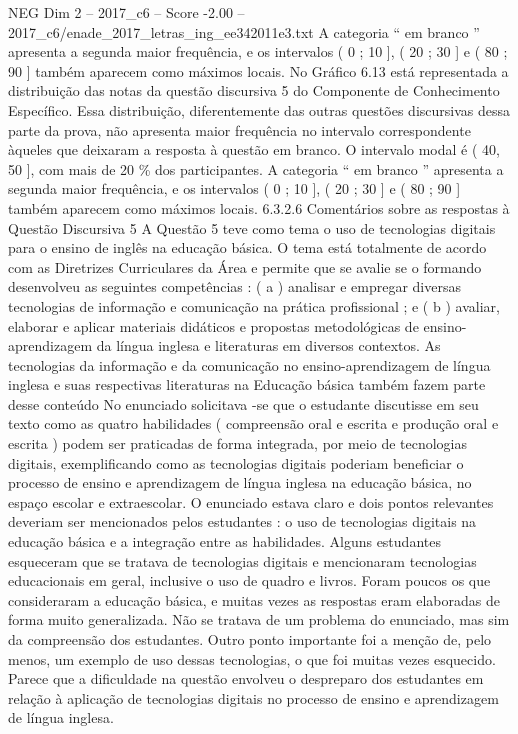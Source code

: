 \begin{textsample}{NEG Dim 2 – 2017\_c6 – Score -2.00 – 2017\_c6/enade\_2017\_letras\_ing\_ee342011e3.txt}
A categoria “ em branco ” apresenta a segunda maior frequência, e os intervalos ( 0 ; 10 ], ( 20 ; 30 ] e ( 80 ; 90 ] também aparecem como máximos locais.
No Gráfico 6.13 está representada a distribuição das notas da questão discursiva 5 do Componente de Conhecimento Específico.
Essa distribuição, diferentemente das outras questões discursivas dessa parte da prova, não apresenta maior frequência no intervalo correspondente àqueles que deixaram a resposta à questão em branco.
O intervalo modal é ( 40, 50 ], com mais de 20 \% dos participantes.
A categoria “ em branco ” apresenta a segunda maior frequência, e os intervalos ( 0 ; 10 ], ( 20 ; 30 ] e ( 80 ; 90 ] também aparecem como máximos locais. 6.3.2.6 Comentários sobre as respostas à Questão Discursiva 5 A Questão 5 teve como tema o uso de tecnologias digitais para o ensino de inglês na educação básica.
O tema está totalmente de acordo com as Diretrizes Curriculares da Área e permite que se avalie se o formando desenvolveu as seguintes competências : ( a ) analisar e empregar diversas tecnologias de informação e comunicação na prática profissional ; e ( b ) avaliar, elaborar e aplicar materiais didáticos e propostas metodológicas de ensino-aprendizagem da língua inglesa e literaturas em diversos contextos.
As tecnologias da informação e da comunicação no ensino-aprendizagem de língua inglesa e suas respectivas literaturas na Educação básica também fazem parte desse conteúdo No enunciado solicitava -se que o estudante discutisse em seu texto como as quatro habilidades ( compreensão oral e escrita e produção oral e escrita ) podem ser praticadas de forma integrada, por meio de tecnologias digitais, exemplificando como as tecnologias digitais poderiam beneficiar o processo de ensino e aprendizagem de língua inglesa na educação básica, no espaço escolar e extraescolar.
O enunciado estava claro e dois pontos relevantes deveriam ser mencionados pelos estudantes : o uso de tecnologias digitais na educação básica e a integração entre as habilidades.
Alguns estudantes esqueceram que se tratava de tecnologias digitais e mencionaram tecnologias educacionais em geral, inclusive o uso de quadro e livros.
Foram poucos os que consideraram a educação básica, e muitas vezes as respostas eram elaboradas de forma muito generalizada.
Não se tratava de um problema do enunciado, mas sim da compreensão dos estudantes.
Outro ponto importante foi a menção de, pelo menos, um exemplo de uso dessas tecnologias, o que foi muitas vezes esquecido.
Parece que a dificuldade na questão envolveu o despreparo dos estudantes em relação à aplicação de tecnologias digitais no processo de ensino e aprendizagem de língua inglesa.

\end{textsample}
